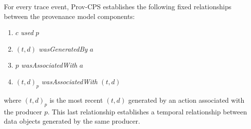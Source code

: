 For every trace event, Prov-CPS establishes the following fixed relationships between the provenance model components:
\begin{enumerate}
 \item $c$ \textit{used} $p$
 \item $(t,d)$ \textit{wasGeneratedBy} $a$
 \item $p$ \textit{wasAssociatedWith} $a$
 \item $(t,d)_{p}$ \textit{wasAssociatedWith} $(t,d)$
\end{enumerate}
where $(t,d)_{p}$ is the most recent $(t,d)$ generated by an action associated with the producer $p$. This last relationship establishes a temporal relationship between data objects generated by the same producer.

 
% 
% 



